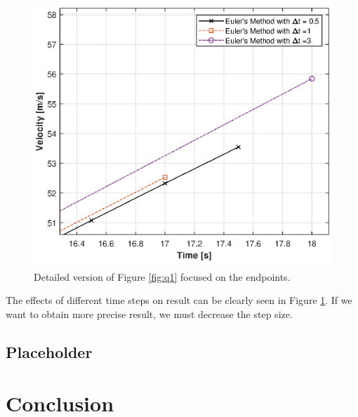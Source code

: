 \documentclass[letterpaper,12pt]{article}
\begin{document}
\newpage
\begin{figure}[ht]
        \centering \includegraphics[max height=10cm]{graphs/question1_finaltime.eps}
        \caption{Detailed version of Figure \ref{fig:q1} focused on the endpoints.}
        \label{fig:q1_closer}
\end{figure}

 The effects of different time steps on result can be clearly seen in Figure \ref{fig:q1_closer}. If we want to obtain
 more precise result, we must decrease the step size.

\subsection{Placeholder}

\section{Conclusion}
\end{document}

